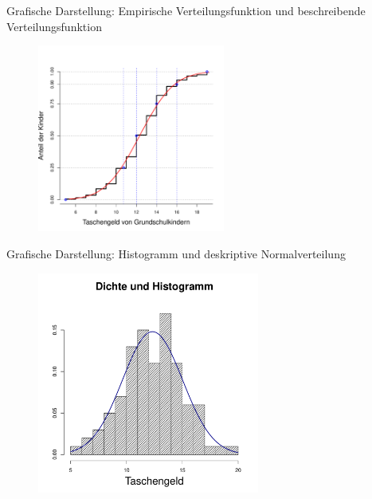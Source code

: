 \documentclass[usenames,dvipsnames,handout]{beamer}
\begin{document}
\begin{frame}{Grafische Darstellung: Empirische Verteilungsfunktion und beschreibende Verteilungsfunktion}
        \begin{figure}[ht]
 	\centering
 	      \includegraphics[width=0.55\textwidth]{taschengeld_theo.pdf}
 	\end{figure}
\end{frame}

\begin{frame}{Grafische Darstellung: Histogramm und deskriptive Normalverteilung}
        \begin{figure}[ht]
 	\centering
 	      \includegraphics[width=0.65\textwidth]{taschengeld_dens.pdf}
 	\end{figure}
\end{frame}
\end{document}

